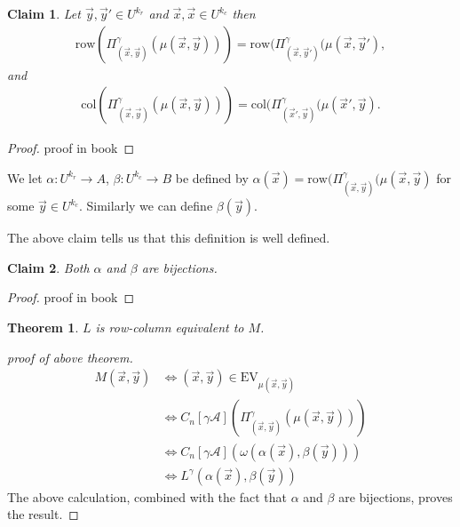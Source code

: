 \documentclass[12pt]{report}
\newtheorem{thm}{Theorem} \newtheorem{claim}{Claim}
\newcommand{\row}{\text{row}}
\newcommand{\column}{\text{col}}
\newcommand{\EV}{\text{EV}}
\begin{document}
\begin{claim}
  Let $\vec{y}, \vec{y}' \in U^{k_r}$ and $\vec{x}, \vec{x} \in U^{k_c }$ then
  \begin{align*}
    \row (\Pi^\gamma_{(\vec{x}, \vec{y})}(\mu(\vec{x}, \vec{y}))) = \row (\Pi^\gamma_{(\vec{x}, \vec{y}')}(\mu(\vec{x}, \vec{y}'),
  \end{align*}
  and
  \begin{align*}
    \column(\Pi^\gamma_{(\vec{x}, \vec{y})}(\mu(\vec{x}, \vec{y}))) = \column
    (\Pi^\gamma_{(\vec{x}', \vec{y})}(\mu(\vec{x}', \vec{y}).
  \end{align*}
\end{claim}
\begin{proof}
  proof in book
\end{proof}

We let $\alpha: U^{k_r} \rightarrow A$, $\beta: U^{k_c} \rightarrow B$ be
defined by $\alpha (\vec{x}) = \row (\Pi^\gamma_{(\vec{x}, \vec{y})} (\mu
(\vec{x}, \vec{y})$ for some $\vec{y} \in U^{k_c}$. Similarly we can define
$\beta (\vec{y})$.

The above claim tells us that this definition is well defined.

\begin{claim} 
  Both $\alpha$ and $\beta$ are bijections.
\end{claim}
\begin{proof}
 proof in book 
\end{proof}

\begin{thm}
  $L$ is row-column equivalent to $M$.
\end{thm}
\begin{proof}[proof of above theorem]
  \begin{align*}
    M(\vec{x}, \vec{y}) &\iff (\vec{x}, \vec{y}) \in \EV_{\mu({\vec{x}, \vec{y}})} \\  
                        &\iff C_n [\gamma \mathcal{A}] (\Pi^\gamma_{(\vec{x}, \vec{y})} (\mu (\vec{x}, \vec{y}))) \\
                        &\iff C_n [\gamma \mathcal{A}] (\omega (\alpha (\vec{x}), \beta (\vec{y}))) \\
                        &\iff L^\gamma (\alpha (\vec{x}), \beta (\vec{y}))
  \end{align*}
  The above calculation, combined with the fact that $\alpha$ and $\beta$ are
  bijections, proves the result.
\end{proof}


\end{document}
